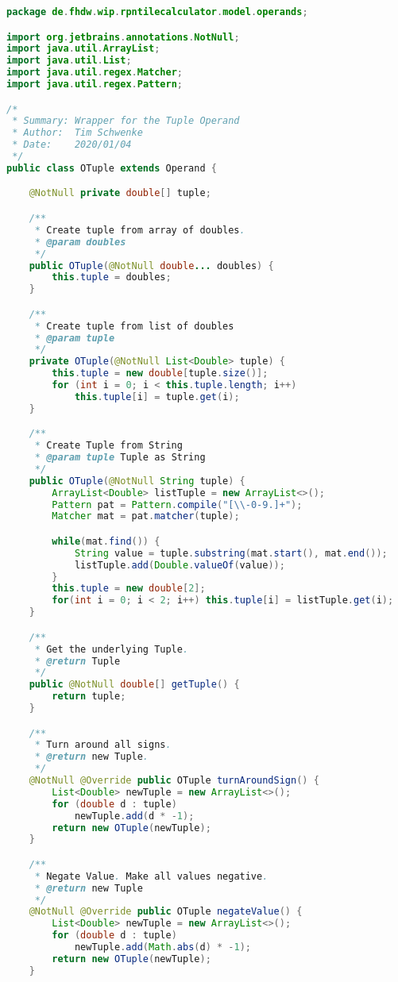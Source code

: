 \begin{lstlisting}[caption=OTuple (Schwenke),label=list:OTuple,language=Java]
package de.fhdw.wip.rpntilecalculator.model.operands;

import org.jetbrains.annotations.NotNull;
import java.util.ArrayList;
import java.util.List;
import java.util.regex.Matcher;
import java.util.regex.Pattern;

/*
 * Summary: Wrapper for the Tuple Operand
 * Author:  Tim Schwenke
 * Date:    2020/01/04
 */
public class OTuple extends Operand {

    @NotNull private double[] tuple;

    /**
     * Create tuple from array of doubles.
     * @param doubles
     */
    public OTuple(@NotNull double... doubles) {
        this.tuple = doubles;
    }

    /**
     * Create tuple from list of doubles
     * @param tuple
     */
    private OTuple(@NotNull List<Double> tuple) {
        this.tuple = new double[tuple.size()];
        for (int i = 0; i < this.tuple.length; i++)
            this.tuple[i] = tuple.get(i);
    }

    /**
     * Create Tuple from String
     * @param tuple Tuple as String
     */
    public OTuple(@NotNull String tuple) {
        ArrayList<Double> listTuple = new ArrayList<>();
        Pattern pat = Pattern.compile("[\\-0-9.]+");
        Matcher mat = pat.matcher(tuple);

        while(mat.find()) {
            String value = tuple.substring(mat.start(), mat.end());
            listTuple.add(Double.valueOf(value));
        }
        this.tuple = new double[2];
        for(int i = 0; i < 2; i++) this.tuple[i] = listTuple.get(i);
    }

    /**
     * Get the underlying Tuple.
     * @return Tuple
     */
    public @NotNull double[] getTuple() {
        return tuple;
    }

    /**
     * Turn around all signs.
     * @return new Tuple.
     */
    @NotNull @Override public OTuple turnAroundSign() {
        List<Double> newTuple = new ArrayList<>();
        for (double d : tuple)
            newTuple.add(d * -1);
        return new OTuple(newTuple);
    }

    /**
     * Negate Value. Make all values negative.
     * @return new Tuple
     */
    @NotNull @Override public OTuple negateValue() {
        List<Double> newTuple = new ArrayList<>();
        for (double d : tuple)
            newTuple.add(Math.abs(d) * -1);
        return new OTuple(newTuple);
    }


\end{lstlisting}
